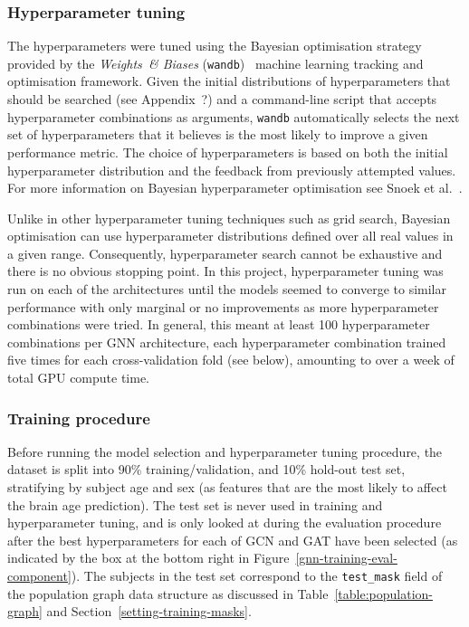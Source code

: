 \subsubsection{Hyperparameter tuning}
The hyperparameters were tuned using the Bayesian optimisation strategy provided by the \textit{Weights~\& Biases} (\texttt{wandb})~\cite{wandb} machine learning tracking and optimisation framework. Given the initial distributions of hyperparameters that should be searched (see Appendix~?) and a command-line script that accepts hyperparameter combinations as arguments, \texttt{wandb} automatically selects the next set of hyperparameters that it believes is the most likely to improve a given performance metric. The choice of hyperparameters is based on both the initial hyperparameter distribution and the feedback from previously attempted values. For more information on Bayesian hyperparameter optimisation see Snoek et al.~\cite{snoek2012practical}.

Unlike in other hyperparameter tuning techniques such as grid search, Bayesian optimisation can use hyperparameter distributions defined over all real values in a given range. Consequently, hyperparameter search cannot be exhaustive and there is no obvious stopping point. In this project, hyperparameter tuning was run on each of the architectures until the models seemed to converge to similar performance with only marginal or no improvements as more hyperparameter combinations were tried. In general, this meant at least 100 hyperparameter combinations per GNN architecture, each hyperparameter combination trained five times for each cross-validation fold (see below), amounting to over a week of total GPU compute time.

\subsubsection{Training procedure}
\label{section:training-procedure}

Before running the model selection and hyperparameter tuning procedure, the dataset is split into 90\% training/validation, and 10\% hold-out test set, stratifying by subject age and sex (as features that are the most likely to affect the brain age prediction). The test set is never used in training and hyperparameter tuning, and is only looked at during the evaluation procedure after the best hyperparameters for each of GCN and GAT have been selected (as indicated by the box at the bottom right in Figure~\ref{gnn-training-eval-component}). The subjects in the test set correspond to the \texttt{test\_mask} field of the population graph data structure as discussed in Table~\ref{table:population-graph} and Section~\ref{setting-training-masks}. 

